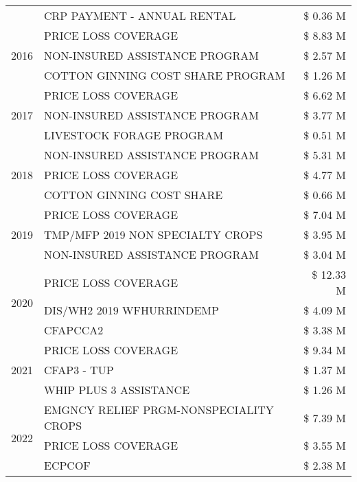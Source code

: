 \begin{tabular}{llr}
 & CRP PAYMENT - ANNUAL RENTAL & \$ 0.36 M \\
\cline{1-3}
\multirow[t]{3}{*}{2016} & PRICE LOSS COVERAGE & \$ 8.83 M \\
 & NON-INSURED ASSISTANCE PROGRAM & \$ 2.57 M \\
 & COTTON GINNING COST SHARE PROGRAM & \$ 1.26 M \\
\cline{1-3}
\multirow[t]{3}{*}{2017} & PRICE LOSS COVERAGE & \$ 6.62 M \\
 & NON-INSURED ASSISTANCE PROGRAM & \$ 3.77 M \\
 & LIVESTOCK FORAGE PROGRAM & \$ 0.51 M \\
\cline{1-3}
\multirow[t]{3}{*}{2018} & NON-INSURED ASSISTANCE PROGRAM & \$ 5.31 M \\
 & PRICE LOSS COVERAGE & \$ 4.77 M \\
 & COTTON GINNING COST SHARE & \$ 0.66 M \\
\cline{1-3}
\multirow[t]{3}{*}{2019} & PRICE LOSS COVERAGE & \$ 7.04 M \\
 & TMP/MFP 2019 NON SPECIALTY CROPS & \$ 3.95 M \\
 & NON-INSURED ASSISTANCE PROGRAM & \$ 3.04 M \\
\cline{1-3}
\multirow[t]{3}{*}{2020} & PRICE LOSS COVERAGE & \$ 12.33 M \\
 & DIS/WH2 2019 WFHURRINDEMP & \$ 4.09 M \\
 & CFAPCCA2 & \$ 3.38 M \\
\cline{1-3}
\multirow[t]{3}{*}{2021} & PRICE LOSS COVERAGE & \$ 9.34 M \\
 & CFAP3 - TUP & \$ 1.37 M \\
 & WHIP PLUS 3 ASSISTANCE & \$ 1.26 M \\
\cline{1-3}
\multirow[t]{3}{*}{2022} & EMGNCY RELIEF PRGM-NONSPECIALITY CROPS & \$ 7.39 M \\
 & PRICE LOSS COVERAGE & \$ 3.55 M \\
 & ECPCOF & \$ 2.38 M \\
\cline{1-3}
\bottomrule
\end{tabular}
